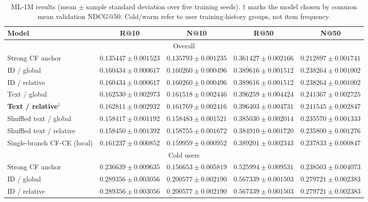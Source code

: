 \begin{table}[t]
\centering
\caption{ML-1M results (mean $\pm$ sample standard deviation over five training seeds). $\dagger$ marks the model chosen by common mean validation NDCG@50. Cold/warm refer to user training-history groups, not item frequency.}
\label{tab:ml1m_research_v3}
\begin{tabular}{lcccc}
\toprule
Model & R@10 & N@10 & R@50 & N@50 \\
\midrule
\multicolumn{5}{c}{Overall} \\
\midrule
Strong CF anchor & $0.135447 \pm 0.001523$ & $0.135793 \pm 0.001235$ & $0.361427 \pm 0.002166$ & $0.212897 \pm 0.001741$ \\
ID / global & $0.160434 \pm 0.000617$ & $0.160260 \pm 0.000496$ & $0.389616 \pm 0.001512$ & $0.238264 \pm 0.001002$ \\
ID / relative & $0.160434 \pm 0.000617$ & $0.160260 \pm 0.000496$ & $0.389616 \pm 0.001512$ & $0.238264 \pm 0.001002$ \\
Text / global & $0.162530 \pm 0.002973$ & $0.161518 \pm 0.002446$ & $0.396259 \pm 0.004424$ & $0.241367 \pm 0.002725$ \\
\textbf{Text / relative}$^{\dagger}$ & $0.162811 \pm 0.002932$ & $0.161769 \pm 0.002416$ & $0.396403 \pm 0.004731$ & $0.241545 \pm 0.002847$ \\
Shuffled text / global & $0.158417 \pm 0.001192$ & $0.158483 \pm 0.001521$ & $0.385030 \pm 0.002014$ & $0.235570 \pm 0.001333$ \\
Shuffled text / relative & $0.158450 \pm 0.001392$ & $0.158755 \pm 0.001672$ & $0.384910 \pm 0.001720$ & $0.235800 \pm 0.001276$ \\
Single-branch CF-CE (local) & $0.161237 \pm 0.000852$ & $0.159959 \pm 0.000952$ & $0.389201 \pm 0.002343$ & $0.237833 \pm 0.000847$ \\
\midrule
\multicolumn{5}{c}{Cold users} \\
\midrule
Strong CF anchor & $0.236639 \pm 0.009635$ & $0.156653 \pm 0.005819$ & $0.525994 \pm 0.009531$ & $0.238503 \pm 0.004073$ \\
ID / global & $0.289356 \pm 0.003056$ & $0.200577 \pm 0.002190$ & $0.567339 \pm 0.001503$ & $0.279721 \pm 0.002383$ \\
ID / relative & $0.289356 \pm 0.003056$ & $0.200577 \pm 0.002190$ & $0.567339 \pm 0.001503$ & $0.279721 \pm 0.002383$ \\

\end{tabular}
\end{table}
